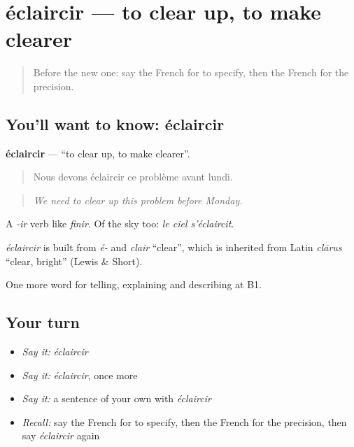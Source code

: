 \section[éclaircir]{éclaircir — to clear up, to make clearer}

\label{lesson:FR-C341-eclaircir}



\begin{quote}
Before the new one: say the French for to specify, then the French for the precision.
\end{quote}

\subsection*{You'll want to know: éclaircir}
\textbf{éclaircir} — \textquotedblleft{}to clear up, to make clearer\textquotedblright{}.

\begin{quote}
Nous devons éclaircir ce problème avant lundi.
\end{quote}

\begin{quote}
\emph{We need to clear up this problem before Monday.}
\end{quote}

A \emph{-ir} verb like \emph{finir}. Of the sky too: \emph{le ciel s'éclaircit}.

\begin{cousinweb}
\emph{éclaircir} is built from \emph{é-} and \emph{clair} \textquotedblleft{}clear\textquotedblright{}, which is inherited from Latin \emph{clārus} \textquotedblleft{}clear, bright\textquotedblright{} (Lewis \& Short).
\end{cousinweb}

\begin{grammarlens}[title={What you've built}]
One more word for telling, explaining and describing at B1.
\end{grammarlens}

\subsection*{Your turn}
\begin{itemize}
\raggedright
  \item \emph{Say it:} \emph{éclaircir}
  \item \emph{Say it:} \emph{éclaircir}, once more
  \item \emph{Say it:} a sentence of your own with \emph{éclaircir}
  \item \emph{Recall:} say the French for to specify, then the French for the precision, then say \emph{éclaircir} again
\end{itemize}

